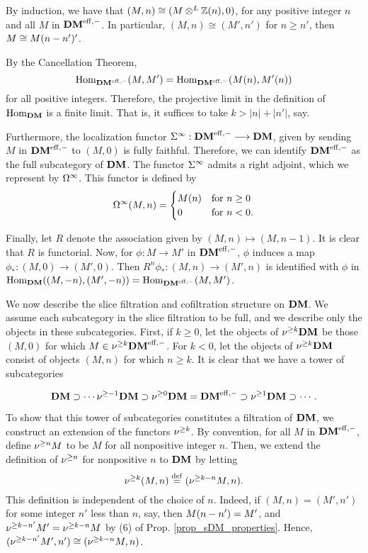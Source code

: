 \begin{rmk}
By induction, we have that $(M, n) \cong (M \tDM \Z(n), 0)$, for 
any positive integer $n$ and all $M$ in $\DMeff$. In particular,
$(M, n) \cong (M', n')$ for $n \geq n'$, then $M \cong 
\tZ[n - n']M'$.
\end{rmk}

\begin{rmk}\label{rmk_homs_in_DM}
By the Cancellation Theorem, 
\[
\homDMf(M, M') = \homDMf(\tZ[n]{M}, \tZ[n]{M'})
\]
for all positive integers. Therefore, the projective limit in the 
definition of $\homDM$ is a finite limit. That is, it suffices to 
take $k > |n| + |n'|$, say.

Furthermore, the localization functor $\spectDM: \DMeff \to \DM$, 
given by sending $M$ in $\DMeff$ to $(M, 0)$ is fully faithful. 
Therefore, we can identify $\DMeff$ as the full subcategory of 
$\DM$. The functor $\spectDM$ admits a right adjoint, which we 
represent by $\loopDM$. This functor is defined by 
\[
\loopDM(M, n) = \begin{cases}
\LHI[n]{M} &\textrm{for }n \geq 0 \\
0 &\textrm{for }n < 0.
\end{cases}
\]

Finally, let $R$ denote the association given by $(M, n) \mapsto
(M, n - 1)$. It is clear that $R$ is functorial. Now, for $\phi: 
M \to M'$ in $\DMeff$, $\phi$ induces a map $\phi_*: (M, 0)
\to (M', 0)$. Then $R^n\phi_* : (M, n) \to (M', n)$ is identified 
with $\phi$ in $\homDM((M, -n), (M', -n)) = \homDMf(M, M')$.
\end{rmk}

We now describe the slice filtration and cofiltration structure on 
$\DM$. We assume each subcategory in the slice filtration to be 
full, and we describe only the objects in these subcategories. 
First, if $k \geq 0$, let the objects of $\sgDM{k} \DM$ be those 
$(M, 0)$ for which $M \in \sgDM{k} \DMeff$. For $k < 0$, let the 
objects of $\sgDM{k} \DM$ consist of objects $(M, n)$ for which 
$n \geq k$. It is clear that we have a tower of subcategories

\begin{equation}\label{eq_DM_slice_filt}
\DM \supset \cdots \sgDM{-1}\DM \supset \sgDM{0}\DM = \DMeff 
   \supset \sgDM{1}\DM \supset \cdots.
\end{equation}

To show that this tower of subcategories constitutes a filtration
of $\DM$, we construct an extension of the functors $\sgDM{k}$.
By convention, for all $M$ in $\DMeff$, define $\sgDM{n} M$ to be 
$M$ for all nonpositive integer $n$. Then, we extend the 
definition of $\sgDM{n}$ for nonpositive $n$ to $\DM$ by letting
\[
\sgDM{k}(M, n) \defeq (\sgDM{k - n}M, n).
\]
This definition is independent of the choice of $n$. Indeed, if
$(M, n) = (M', n')$ for some integer $n'$ less than $n$, say, then
$\tZ[n - n']{M} = M'$, and $\sgDM{k - n'}M' = \sgDM{k - n}M$ by
(6) of Prop. \ref{prop_sDM_properties}. Hence, $(\sgDM{k - n'}M', 
n') \cong (\sgDM{k - n}M, n)$.

